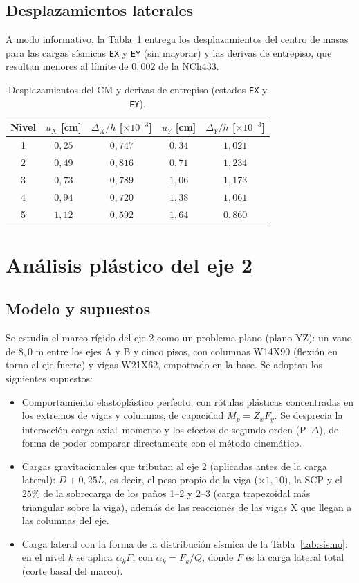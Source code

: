 \documentclass[11pt,letterpaper]{article}
\begin{document}
\subsection{Desplazamientos laterales}
A modo informativo, la Tabla~\ref{tab:desp} entrega los desplazamientos del centro de masas para las cargas
sísmicas \texttt{EX} y \texttt{EY} (sin mayorar) y las derivas de entrepiso, que resultan menores al límite
de $0{,}002$ de la NCh433.
\begin{table}[H]
\centering
\caption{Desplazamientos del CM y derivas de entrepiso (estados \texttt{EX} y \texttt{EY}).}
\label{tab:desp}
\begin{tabular}{ccccc}
\toprule
Nivel & $u_X$ [cm] & $\Delta_X/h$ [$\times 10^{-3}$] & $u_Y$ [cm] & $\Delta_Y/h$ [$\times 10^{-3}$] \\
\midrule
1 & $0{,}25$ & $0{,}747$ & $0{,}34$ & $1{,}021$ \\
2 & $0{,}49$ & $0{,}816$ & $0{,}71$ & $1{,}234$ \\
3 & $0{,}73$ & $0{,}789$ & $1{,}06$ & $1{,}173$ \\
4 & $0{,}94$ & $0{,}720$ & $1{,}38$ & $1{,}061$ \\
5 & $1{,}12$ & $0{,}592$ & $1{,}64$ & $0{,}860$ \\
\bottomrule
\end{tabular}
\end{table}

\section{Análisis plástico del eje 2}

\subsection{Modelo y supuestos}
Se estudia el marco rígido del eje 2 como un problema plano (plano YZ): un vano de $8{,}0$ m entre los ejes
A y B y cinco pisos, con columnas W14X90 (flexión en torno al eje fuerte) y vigas W21X62,
empotrado en la base. Se adoptan los siguientes supuestos:
\begin{itemize}
  \item Comportamiento elastoplástico perfecto, con rótulas plásticas concentradas en los extremos de vigas y
        columnas, de capacidad $M_p = Z_x F_y$. Se desprecia la interacción carga axial--momento y los efectos
        de segundo orden (P--$\Delta$), de forma de poder comparar directamente con el método cinemático.
  \item Cargas gravitacionales que tributan al eje 2 (aplicadas antes de la carga lateral):
        $D + 0{,}25L$, es decir, el peso propio de la viga ($\times 1{,}10$), la SCP y el $25\%$ de la
        sobrecarga de los paños 1--2 y 2--3 (carga trapezoidal más triangular sobre la viga), además de las reacciones de las
        vigas X que llegan a las columnas del eje.
  \item Carga lateral con la forma de la distribución sísmica de la Tabla~\ref{tab:sismo}: en el nivel $k$ se aplica
        $\alpha_k F$, con $\alpha_k = F_k/Q$, donde $F$ es la carga lateral total (corte basal del marco).
\end{itemize}
\end{document}

